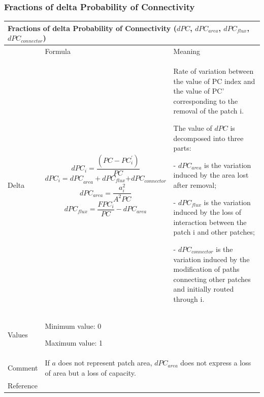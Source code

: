 \documentclass{article}
\begin{document}
\subsubsection{Fractions of delta Probability of Connectivity}
\label{metric_dPC}
\begin{table}[H]
\begin{tabular}{|m{2.4919999cm}|m{5.229cm}m{7.924cm}|}
\hline
\multicolumn{3}{|m{16.044998cm}|}{Fractions of delta Probability of
Connectivity ($dPC$, $dPC_{area}$, $dPC_{flux}$, $dPC_{connector}$)}\\\hline
 &
\multicolumn{1}{m{5.229cm}|}{Formula} &
Meaning\\\hline
Delta &
\multicolumn{1}{m{5.229cm}|}{\begin{equation*}
{\mathit{dPC}}_{i}=\frac{(\mathit{PC}-{\mathit{PC}}_{i}^{'})}{\mathit{PC}}
\end{equation*}
\begin{equation*}
{{\mathit{dPC}}_{i}=\mathit{dPC}}_{\mathit{area}}+{\mathit{dPC}}_{\mathit{flux}}{+\mathit{dPC}}_{\mathit{connector}}
\end{equation*}
\begin{equation*}
{\mathit{dPC}}_{\mathit{area}}=\frac{{a}_{i}^{2}}{{A}^{2}\mathit{PC}}
\end{equation*}
\begin{equation*}
{dPC}_{flux}=\frac{{FPC}_{i}}{PC}-{dPC}_{area}
\end{equation*}
} &
Rate of variation between the value of PC index and the value of PC’
corresponding to the removal of the patch i.

The value of $dPC$ is decomposed into three parts:

{}- $dPC_{area}$ is the variation induced by the area lost after removal;

{}- $dPC_{flux}$ is the variation induced by the loss of interaction between
the patch i and other patches;

{}- $dPC_{connector}$ is the variation induced by the modification of paths
connecting other patches and initially routed through i.~\\\hline
Values &
\multicolumn{2}{m{13.353cm}|}{
Minimum value: 0

Maximum value: 1
}\\\hline
Comment &
\multicolumn{2}{m{13.353cm}|}{

If $a$ does not represent patch area, $dPC_{area}$ does not express a loss of area but a loss of capacity.

}\\\hline
Reference &
\multicolumn{2}{m{13.353cm}|}{\cite{Saura2010}}\\\hline
\end{tabular}
\end{table}
\end{document}
